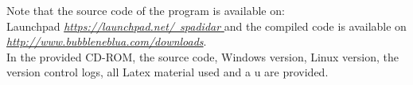 \documentclass[10pt, a4paper, titlepage]{article}
\begin{document}
Note that the source code of the program is available on:\\
Launchpad \underline{\textit{https://launchpad.net/~spadidar} } and the compiled code is available on\\
\underline{\textit{http://www.bubbleneblua.com/downloads}}.\\
In the provided CD-ROM, the source code, Windows version, Linux version, the version control logs, all Latex material used and a u are provided.


\newpage
	
\end{document}
